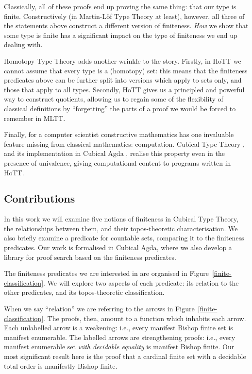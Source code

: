 Classically, all of these proofs end up proving the same thing: that our type is
finite.
Constructively (in Martin-Löf Type Theory
\cite{martin-lofIntuitionisticTypeTheory1980} at least), however, all three
of the statements above construct a different version of finiteness.
\emph{How} we show that some type is finite has a significant impact on the
type of finiteness we end up dealing with.

Homotopy Type Theory \cite{hottbook} adds another wrinkle to the story.
Firstly, in HoTT we cannot assume that every type is a (homotopy) set: this
means that the finiteness predicates above can be further split into versions
which apply to sets only, and those that apply to all types.
Secondly, HoTT gives us a principled and powerful way to construct quotients,
allowing us to regain some of the flexibility of classical definitions by
``forgetting'' the parts of a proof we would be forced to remember in MLTT.

Finally, for a computer scientist constructive mathematics has one invaluable
feature missing from classical mathematics: computation.
Cubical Type Theory \cite{cohenCubicalTypeTheory2016}, and its implementation in
Cubical Agda \cite{vezzosiCubicalAgdaDependently2019}, realise this property
even in the presence of univalence, giving computational content to programs
written in HoTT.
\subsection{Contributions}
In this work we will examine five notions of finiteness in Cubical Type Theory,
the relationships between them, and their topos-theoretic characterisation.
We also briefly examine a predicate for countable sets, comparing it to the
finiteness predicates.
Our work is formalised in Cubical Agda, where we also develop a library for
proof search based on the finiteness predicates.



The finiteness predicates we are interested in are organised in
Figure~\ref{finite-classification}.
We will explore two aspects of each predicate: its relation to the other
predicates, and its topos-theoretic classification.

When we say ``relation'' we are referring to the arrows in
Figure~\ref{finite-classification}.
The proofs, then, amount to a function which inhabits each arrow.
Each unlabelled arrow is a weakening: i.e., every manifest Bishop finite set
is manifest enumerable.
The labelled arrows are strengthening proofs: i.e., every manifest enumerable set
\emph{with decidable equality} is manifest Bishop finite.
Our most significant result here is the proof that a cardinal finite set with a
decidable total order is manifestly Bishop finite.

